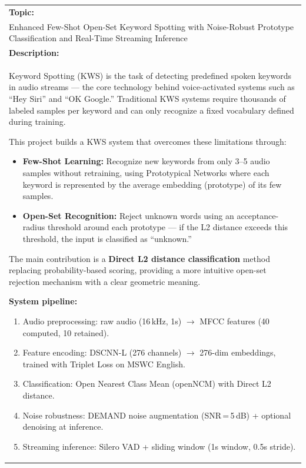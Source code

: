 \documentclass[11pt,a4paper]{article}
\begin{document}
\renewcommand{\arraystretch}{1.15}
\begin{tabularx}{\textwidth}{|X|}
\hline

\textbf{Topic:} \\[0.15cm]
Enhanced Few-Shot Open-Set Keyword Spotting with Noise-Robust Prototype Classification and Real-Time Streaming Inference
\\[0.15cm]
\hline

\textbf{Description:} \\[0.1cm]
Keyword Spotting (KWS) is the task of detecting predefined spoken keywords in audio streams --- the core technology behind voice-activated systems such as ``Hey Siri'' and ``OK Google.'' Traditional KWS systems require thousands of labeled samples per keyword and can only recognize a fixed vocabulary defined during training.

\vspace{0.15cm}
This project builds a KWS system that overcomes these limitations through:
\begin{itemize}[leftmargin=0.8cm, topsep=1pt, itemsep=1pt, parsep=0pt]
    \item \textbf{Few-Shot Learning:} Recognize new keywords from only 3--5 audio samples without retraining, using Prototypical Networks where each keyword is represented by the average embedding (prototype) of its few samples.
    \item \textbf{Open-Set Recognition:} Reject unknown words using an acceptance-radius threshold around each prototype --- if the L2 distance exceeds this threshold, the input is classified as ``unknown.''
\end{itemize}

\vspace{0.1cm}
The main contribution is a \textbf{Direct L2 distance classification} method replacing probability-based scoring, providing a more intuitive open-set rejection mechanism with a clear geometric meaning.

\vspace{0.15cm}
\textbf{System pipeline:}
\begin{enumerate}[leftmargin=0.8cm, topsep=1pt, itemsep=1pt, parsep=0pt]
    \item Audio preprocessing: raw audio (16\,kHz, 1s) $\rightarrow$ MFCC features (40 computed, 10 retained).
    \item Feature encoding: DSCNN-L (276 channels) $\rightarrow$ 276-dim embeddings, trained with Triplet Loss on MSWC English.
    \item Classification: Open Nearest Class Mean (openNCM) with Direct L2 distance.
    \item Noise robustness: DEMAND noise augmentation (SNR\,=\,5\,dB) + optional denoising at inference.
    \item Streaming inference: Silero VAD + sliding window (1s window, 0.5s stride).
\end{enumerate}


\end{tabularx}
\end{document}
